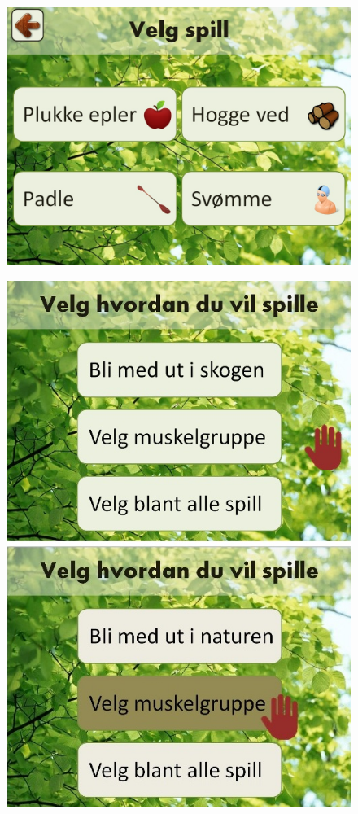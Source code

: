 \begin{figure} [H]
\centering
\includegraphics[scale=0.4]{VelgSpill.jpg}
\label{velgSpillNorsk}
\end{figure}

\begin{figure} [H]
\centering
\includegraphics[scale=0.5]{menuAvatarAction.jpg}
\label{fig:avatarActionNorsk}
\end{figure} 


